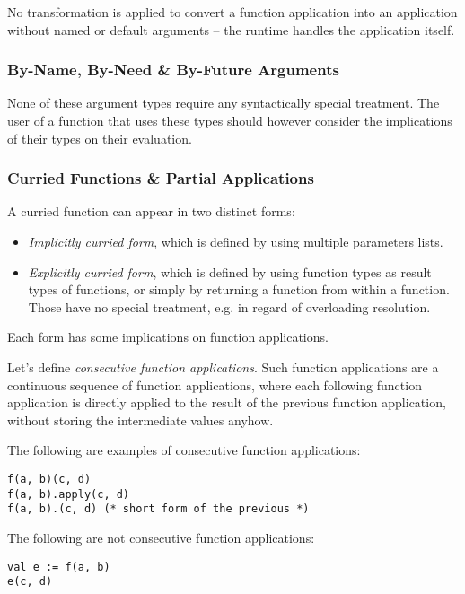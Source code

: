 No transformation is applied to convert a function application into an application without named or default arguments -- the runtime handles the application itself. 






\subsubsection{By-Name, By-Need \& By-Future Arguments}
\label{sec:by-name-arguments}
\label{sec:by-need-arguments}
\label{sec:by-future-arguments}

None of these argument types require any syntactically special treatment. The user of a function that uses these types should however consider the implications of their types on their evaluation. 





\subsubsection{Curried Functions \& Partial Applications}
\label{sec:curried-functions}
\label{sec:partial-applications}

A curried function can appear in two distinct forms:
\begin{itemize}
  \item[] {\em Implicitly curried form}, which is defined by using multiple parameters lists. 
  \item[] {\em Explicitly curried form}, which is defined by using function types as result types of functions, or simply by returning a function from within a function. Those have no special treatment, e.g. in regard of overloading resolution. 
\end{itemize}

Each form has some implications on function applications. 

Let's define {\em consecutive function applications}. Such function applications are a continuous sequence of function applications, where each following function application is directly applied to the result of the previous function application, without storing the intermediate values anyhow. 

\example The following are examples of consecutive function applications:
\begin{lstlisting}
f(a, b)(c, d)
f(a, b).apply(c, d)
f(a, b).(c, d) (* short form of the previous *)
\end{lstlisting}
The following are not consecutive function applications:
\begin{lstlisting}
val e := f(a, b)
e(c, d)
\end{lstlisting}


